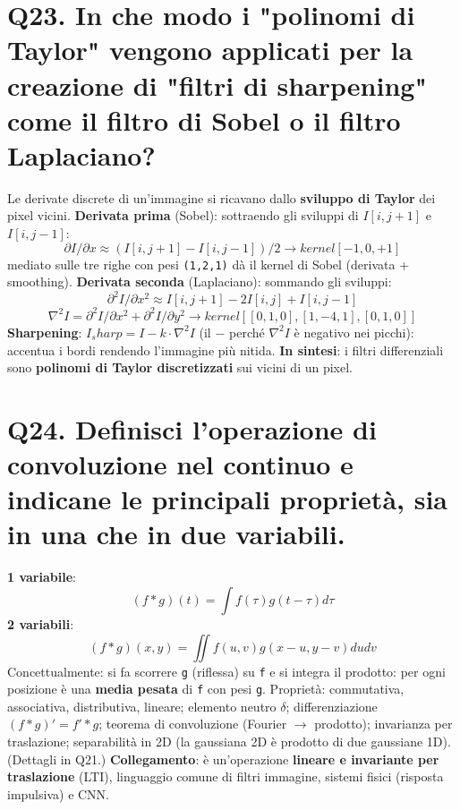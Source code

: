 \documentclass[11pt,a4paper]{article}
\begin{document}
\section*{Q23. In che modo i "polinomi di Taylor" vengono applicati per la creazione di "filtri di sharpening" come il filtro di Sobel o il filtro Laplaciano?}
Le derivate discrete di un'immagine si ricavano dallo \textbf{sviluppo di Taylor} dei pixel vicini.
\textbf{Derivata prima} (Sobel): sottraendo gli sviluppi di $I[i,j+1]$ e $I[i,j-1]$:
\[ \partial I/\partial x \approx  (I[i,j+1] - I[i,j-1]) / 2     \to  kernel [-1, 0, +1] \]
mediato sulle tre righe con pesi \texttt{(1,2,1)} dà il kernel di Sobel (derivata + smoothing).
\textbf{Derivata seconda} (Laplaciano): sommando gli sviluppi:
\[ \partial ^{2}I/\partial x^{2} \approx  I[i,j+1] - 2I[i,j] + I[i,j-1] \]
\[ \nabla ^{2}I = \partial ^{2}I/\partial x^{2} + \partial ^{2}I/\partial y^{2}   \to  kernel [[0,1,0],[1,-4,1],[0,1,0]] \]
\textbf{Sharpening}: $I_sharp = I - k\cdot \nabla ^{2}I$ (il $-$ perché $\nabla ^{2}I$ è negativo nei picchi): accentua i bordi rendendo l'immagine più nitida.
\textbf{In sintesi}: i filtri differenziali sono \textbf{polinomi di Taylor discretizzati} sui vicini di un pixel.
\newpage
\section*{Q24. Definisci l'operazione di convoluzione nel continuo e indicane le principali proprietà, sia in una che in due variabili.}
\textbf{1 variabile}:
\[ (f * g)(t) = \int  f(\tau ) g(t - \tau ) d\tau  \]
\textbf{2 variabili}:
\[ (f * g)(x,y) = \iint  f(u,v) g(x-u, y-v) du dv \]
Concettualmente: si fa scorrere \texttt{g} (riflessa) su \texttt{f} e si integra il prodotto: per ogni posizione è una \textbf{media pesata} di \texttt{f} con pesi \texttt{g}.
Proprietà: commutativa, associativa, distributiva, lineare; elemento neutro $\delta $; differenziazione $(f*g)' = f'*g$; teorema di convoluzione (Fourier $\to $ prodotto); invarianza per traslazione; separabilità in 2D (la gaussiana 2D è prodotto di due gaussiane 1D). (Dettagli in Q21.)
\textbf{Collegamento}: è un'operazione \textbf{lineare e invariante per traslazione} (LTI), linguaggio comune di filtri immagine, sistemi fisici (risposta impulsiva) e CNN.
\newpage
\end{document}
